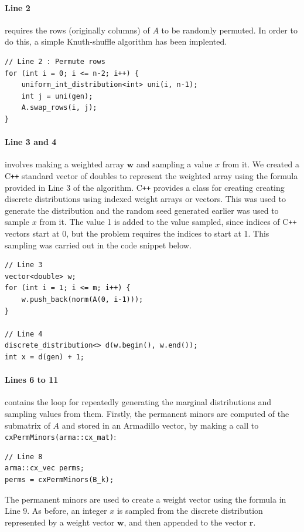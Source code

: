 \documentclass[ %
                    author={Manan Vaswani},
                supervisor={Dr. Raphael Clifford},
                    degree={MEng},
                     title={A multi-core CPU implementation of the classical Boson Sampling algorithm},
                  subtitle={},
                      type={},
                      year={2019} ]{dissertation}
\theoremstyle{plain}
\theoremstyle{definition}
\begin{document}
\paragraph{Line 2} requires the rows (originally columns) of $A$ to be randomly permuted. In order to do this, a simple Knuth-shuffle algorithm \cite{knuth1969} has been implented. 
\begin{verbatim}
// Line 2 : Permute rows
for (int i = 0; i <= n-2; i++) {
    uniform_int_distribution<int> uni(i, n-1);
    int j = uni(gen);
    A.swap_rows(i, j);
}
\end{verbatim}
\paragraph{Line 3 and 4} involves making a weighted array $\mathbf{w}$ and sampling a value $x$ from it. We created a C\texttt{++} standard vector of doubles to represent the weighted array using the formula provided in Line 3 of the algorithm. C\texttt{++} provides a class for creating creating discrete distributions using indexed weight arrays or vectors. This was used to generate the distribution and the random seed generated earlier was used to sample $x$ from it. The value 1 is added to the value sampled, since indices of C\texttt{++} vectors start at 0, but the problem requires the indices to start at 1. This sampling was carried out in the code snippet below.
\begin{verbatim}
// Line 3
vector<double> w;
for (int i = 1; i <= m; i++) {
    w.push_back(norm(A(0, i-1)));
}

// Line 4
discrete_distribution<> d(w.begin(), w.end());
int x = d(gen) + 1;
\end{verbatim}
\paragraph{Lines 6 to 11} contains the loop for repeatedly generating the marginal distributions and sampling values from them. Firstly, the permanent minors are computed of the submatrix of $A$ and stored in an Armadillo vector, by making a call to \texttt{cxPermMinors(arma::cx_mat)}:
\begin{verbatim}
// Line 8
arma::cx_vec perms;
perms = cxPermMinors(B_k);
\end{verbatim}
The permanent minors are used to create a weight vector using the formula in Line 9. As before, an integer $x$ is sampled from the discrete distribution represented by a weight vector $\mathbf{w}$, and then appended to the vector $\mathbf{r}$.
\end{document}
